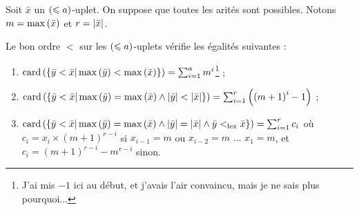 		\begin{prop}
			\label{prop:bon_ordre_combinatoire}
			Soit $\bar{x}$ un $\left( \leqslant a \right)$-uplet. On suppose que toutes les arités sont possibles. Notons $m = \max\left( \bar{x} \right)$ et $r = \left|\bar{x}\right|$.
			
			Le bon ordre $<$ sur les $\left( \leqslant a \right)$-uplets vérifie les égalités suivantes :
			
			\begin{enumerate}
				\item 	\label{itm:bon_ordre_combinatoire1} $\text{card}\left( \left\lbrace \bar{y} < \bar{x} | \max\left( \bar{y} \right) < \max\left( \bar{x} \right) \right\rbrace \right) = \sum_{i=1}^{a} m^i$\footnote{J'ai mis $-1$ ici au début, et j'avais l'air convaincu, mais je ne sais plus pourquoi...} ;
				\item 	\label{itm:bon_ordre_combinatoire2} $\text{card}\left( \left\lbrace \bar{y} < \bar{x} | \max\left( \bar{y} \right) = \max\left( \bar{x} \right) \wedge \left|\bar{y}\right| < \left|\bar{x}\right|  \right\rbrace \right) = \sum_{i=1}^{r} \left( \left(m+1\right)^i -1 \right)$ ; 
				\item 	\label{itm:bon_ordre_combinatoire3} $\text{card}\left( \left\lbrace \bar{y} < \bar{x} | \max\left( \bar{y} \right) = \max\left( \bar{x} \right) \wedge \left|\bar{y}\right| = \left|\bar{x}\right| \wedge \bar{y} <_{\text{lex}} \bar{x}  \right\rbrace \right) = \sum_{i=1}^{r} c_i$ où $c_i = x_i \times \left(m+1\right)^{r-i}$ si $x_{i-1} = m$ ou $x_{i-2} = m$ $\dots$ $x_{1} = m$, et $c_i = \left(m+1\right)^{r-i}-m^{r-i}$ sinon. 
			\end{enumerate}
		\end{prop}
		
